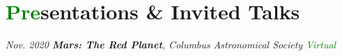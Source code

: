 \documentclass[11pt]{article}
\begin{document}


\section*{\textcolor{green}{Pre}sentations \& Invited Talks}

\textit{Nov. 2020 \textbf{Mars: The Red Planet}, Columbus Astronomical Society \hfill \textcolor{green}{Virtual}}
\end{document}
